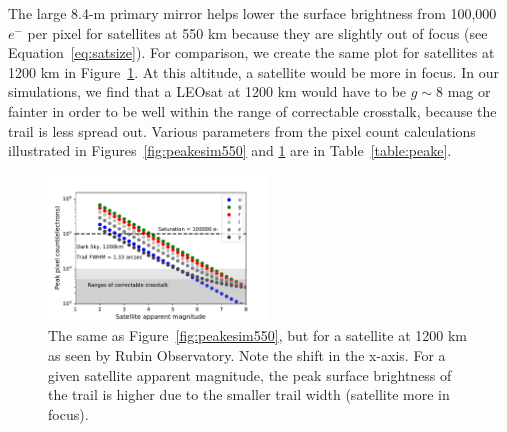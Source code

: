 \documentclass[twocolumn,trackchanges]{aastex63}
\begin{document}

The large 8.4-m primary mirror helps lower the surface brightness from 100,000 $e^-$ per pixel for satellites at 550 km because they are slightly out of focus (see Equation~\ref{eq:satsize}). For comparison, we create the same plot for satellites at 1200 km in Figure~\ref{fig:peaksim1200}. At this altitude, a satellite would be more in focus.
In our simulations, we find that a LEOsat at 1200 km would have to be $g\sim8$ mag or fainter in order to be well within the range of correctable crosstalk, because the trail is less spread out. Various parameters from the pixel count calculations illustrated in Figures~\ref{fig:peakesim550} and \ref{fig:peaksim1200} are in Table~\ref{table:peake}.

\begin{figure}[ht!]
\includegraphics[width=0.52\textwidth]{Peak_count_by_band_1200km_darkSky.pdf}
\caption{The same as Figure~\ref{fig:peakesim550}, but for a satellite at 1200 km as seen by Rubin Observatory. Note the shift in the x-axis. For a given satellite apparent magnitude, the peak surface brightness of the trail is higher due to the smaller trail width (satellite more in focus). \label{fig:peaksim1200}}
\end{figure}
\end{document}

